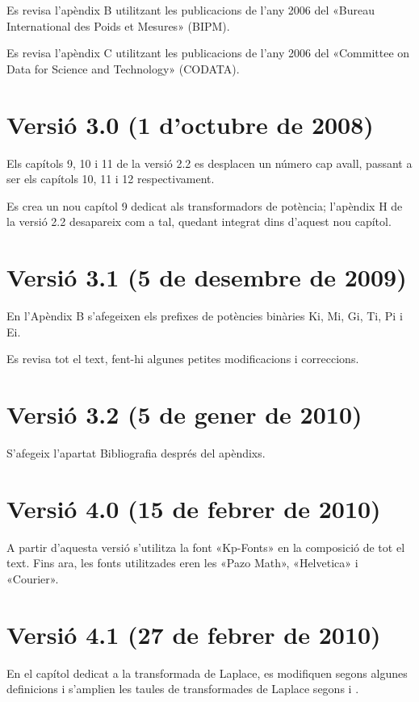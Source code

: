 Es revisa l'apèndix B utilitzant les publicacions de l'any 2006 del «Bureau
International des Poids et Mesures» (BIPM).

Es revisa l'apèndix C utilitzant les publicacions de l'any 2006 del «Committee on Data for Science and Technology» (CODATA).

\section*{Versió 3.0 (1 d'octubre de 2008)}

Els capítols 9, 10 i 11 de la versió 2.2 es desplacen un número cap
avall, passant a ser els capítols 10, 11 i 12 respectivament.

Es crea un nou capítol 9 dedicat als transformadors de potència;
l'apèndix H de la versió 2.2 desapareix com a tal, quedant integrat
dins d'aquest nou capítol.


\section*{Versió 3.1 (5 de desembre de 2009)}
En l'Apèndix B s'afegeixen els prefixes de potències binàries Ki, Mi, Gi, Ti, Pi i Ei.

Es revisa tot el text, fent-hi algunes petites modificacions i
correccions.

\section*{Versió 3.2 (5 de gener de 2010)}
S'afegeix l'apartat Bibliografia després del apèndixs.


\section*{Versió 4.0 (15 de febrer de 2010)}
A partir d'aquesta versió s'utilitza la font «Kp-Fonts» en la composició de tot el text. Fins ara, les fonts utilitzades eren les «Pazo Math», «Helvetica» i «Courier».


\section*{Versió 4.1 (27 de febrer de 2010)}
En el capítol dedicat a la transformada de Laplace, es modifiquen segons \cite{SCH} algunes definicions  i s'amplien les taules de transformades de Laplace segons \cite{SCH} i \cite{RASd}.

